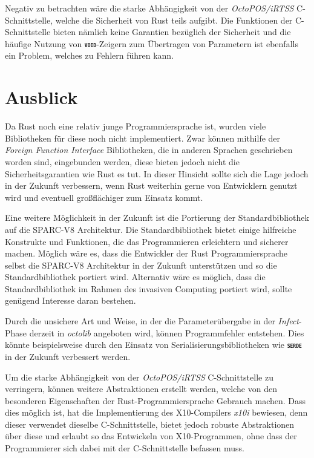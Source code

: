 Negativ zu betrachten wäre die starke Abhängigkeit von der \textit{OctoPOS/iRTSS} C-Schnittstelle,
welche die Sicherheit von Rust teils aufgibt. Die Funktionen der C-Schnittstelle bieten nämlich keine Garantien 
bezüglich der Sicherheit und die häufige Nutzung von \texttt{\textsc{\textbf{void}}}-Zeigern zum Übertragen
von Parametern ist ebenfalls ein Problem, welches zu Fehlern führen kann.

\section{Ausblick}

Da Rust noch eine relativ junge Programmiersprache ist, wurden viele Bibliotheken für diese noch nicht implementiert.
Zwar können mithilfe der \textit{Foreign Function Interface} Bibliotheken,
die in anderen Sprachen geschrieben worden sind, eingebunden werden, diese bieten jedoch
nicht die Sicherheitsgarantien wie Rust es tut.
In dieser Hinsicht sollte sich die Lage jedoch in der Zukunft verbessern, wenn Rust
weiterhin gerne von Entwicklern genutzt wird und eventuell großflächiger zum Einsatz kommt.

Eine weitere Möglichkeit in der Zukunft ist die Portierung der Standardbibliothek auf die SPARC-V8 Architektur.
Die Standardbibliothek bietet einige hilfreiche Konstrukte und Funktionen,
die das Programmieren erleichtern und sicherer machen.
Möglich wäre es, dass die Entwickler der Rust Programmiersprache selbst die SPARC-V8 Architektur
in der Zukunft unterstützen und so die Standardbibliothek portiert wird. Alternativ wäre es möglich, dass die 
Standardbibliothek im Rahmen des invasiven Computing portiert wird, sollte genügend Interesse daran bestehen.

Durch die unsichere Art und Weise, in der die Parameterübergabe in der \textit{Infect}-Phase derzeit in
\textit{octolib} angeboten wird, können Programmfehler entstehen. Dies könnte beispielsweise durch den Einsatz von
Serialisierungsbibliotheken wie \texttt{\textsc{\textbf{serde}}} in der Zukunft verbessert werden.

Um die starke Abhängigkeit von der \textit{OctoPOS/iRTSS} C-Schnittstelle zu verringern,
können weitere Abstraktionen erstellt werden, welche von den
besonderen Eigenschaften der Rust-Programmiersprache Gebrauch machen.
Dass dies möglich ist, hat die Implementierung des X10-Compilers \textit{x10i} bewiesen,
denn dieser verwendet dieselbe C-Schnittstelle,
bietet jedoch robuste Abstraktionen über diese und erlaubt so
das Entwickeln von X10-Programmen, ohne dass der Programmierer sich dabei mit der C-Schnittstelle befassen muss.
